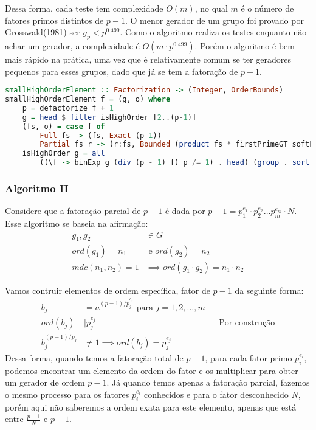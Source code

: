 \documentclass{article}
\begin{document}
Dessa forma, cada teste tem complexidade $O(m)$, no qual $m$ é o número de fatores primos distintos de $p-1$. O menor gerador de um grupo foi provado por Grosswald(1981) ser $g_p < p^{0.499}$. Como o algoritmo realiza os testes enquanto não achar um gerador, a complexidade é $O(m \cdot p ^{0.499})$. Porém o algoritmo é bem mais rápido na prática, uma vez que é relativamente comum se ter geradores pequenos para esses grupos, dado que já se tem a fatoração de $p-1$.

\noindent\hspace{0.03\linewidth}
\begin{minipage}{.9\linewidth}
\begin{lstlisting}[language=haskell, caption=Busca pelo Menor Gerador]
smallHighOrderElement :: Factorization -> (Integer, OrderBounds)
smallHighOrderElement f = (g, o) where
    p = defactorize f + 1
    g = head $ filter isHighOrder [2..(p-1)]
    (fs, o) = case f of
        Full fs -> (fs, Exact (p-1))
        Partial fs r -> (r:fs, Bounded (product fs * firstPrimeGT softLimit) (p-1))
    isHighOrder g = all
        ((\f -> binExp g (div (p - 1) f) p /= 1) . head) (group . sort $ fs)

\end{lstlisting}
\end{minipage}

\subsubsection{Algoritmo II}
Considere que a fatoração parcial de $p-1$ é dada por $p-1 = p_1^{e_1}\cdot p_2^{e_2} \dots p_m^{e_m} \cdot N$.
Esse algoritmo se baseia na afirmação:
\begin{align*}
g_1, g_2 &\in G\\
ord(g_1) = n_1 &\text{ e } ord(g_2) = n_2\\
mdc(n_1, n_2) = 1 &\implies ord(g_1 \cdot g_2) = n_1 \cdot n_2
\end{align*}

Vamos contruir elementos de ordem específica, fator de $p-1$ da seguinte forma:
\begin{align*}
b_j &= a^{(p-1)/p_j^{e_j}} \text{ para } j = 1, 2, \dots, m\\
ord(b_j) &\vert p_j^{e_j}                           &&\text{Por construção}\\
b_j ^ {(p-1)/p_j} &\neq 1 \implies ord(b_j)=p_j^{e_j}
\end{align*}
Dessa forma, quando temos a fatoração total de $p-1$, para cada fator primo $p_i^{e_i}$, podemos encontrar um elemento da ordem do fator e os multiplicar para obter um gerador de ordem $p-1$. 
Já quando temos apenas a fatoração parcial, fazemos o mesmo processo para os fatores $p_i^{e_i}$ conhecidos e para o fator desconhecido $N$, porém aqui não saberemos a ordem exata para este elemento, apenas que está entre $\frac{p-1}{N}$ e $p-1$. 
\end{document}
